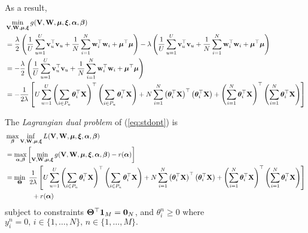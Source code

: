 As a result,
\begin{equation*}
\begin{aligned}
&\min_{\mathbf{V}, \mathbf{W}, \bm{\mu}, \bm{\xi}} g(\mathbf{V}, \mathbf{W}, \bm{\mu}, \bm{\xi}, {\bm{\alpha}}, {\bm{\beta}}) \\
&= \frac{\lambda}{2} \left( \frac{1}{U} \sum_{u=1}^U \mathbf{v}_u^\top \mathbf{v}_u 
     + \frac{1}{N} \sum_{i=1}^N \mathbf{w}_i^\top \mathbf{w}_i + \bm{\mu}^\top \bm{\mu} \right)
     -\lambda \left( \frac{1}{U} \sum_{u=1}^U \mathbf{v}_u^\top \mathbf{v}_u + \frac{1}{N} \sum_{i=1}^N \mathbf{w}_i^\top \mathbf{w}_i + \bm{\mu}^\top \bm{\mu} \right) \\
&= -\frac{\lambda}{2} \left( \frac{1}{U} \sum_{u=1}^U \mathbf{v}_u^\top \mathbf{v}_u + \frac{1}{N} \sum_{i=1}^N \mathbf{w}_i^\top \mathbf{w}_i + \bm{\mu}^\top \bm{\mu} \right) \\
&= -\frac{1}{2 \lambda} \left[
     U \sum_{u=1}^U \left( \sum_{i \in P_u} \bm{\theta}_i^\top \mathbf{X} \right)^\top \left( \sum_{i \in P_u} \bm{\theta}_i^\top \mathbf{X} \right)
   + N \sum_{i=1}^N \left( \bm{\theta}_i^\top \mathbf{X} \right)^\top \left( \bm{\theta}_i^\top \mathbf{X} \right)
   + \left( \sum_{i=1}^N \bm{\theta}_i^\top \mathbf{X} \right)^\top \left( \sum_{i=1}^N \bm{\theta}_i^\top \mathbf{X} \right) \right]
\end{aligned}
\end{equation*}

The \emph{Lagrangian dual problem} of (\ref{eq:stdopt}) is 
\begin{equation*}
\begin{aligned}
&\max_{{\bm{\beta}}} \inf_{\mathbf{V}, \mathbf{W}, \bm{\mu}, \bm{\xi}} L(\mathbf{V}, \mathbf{W}, \bm{\mu}, \bm{\xi}, {\bm{\alpha}}, {\bm{\beta}}) \\
&= \max_{{\bm{\alpha}}, {\bm{\beta}}} \left[ \min_{\mathbf{V}, \mathbf{W}, \bm{\mu}, \bm{\xi}} g(\mathbf{V}, \mathbf{W}, \bm{\mu}, \bm{\xi}, {\bm{\alpha}}, {\bm{\beta}}) - r({\bm{\alpha}}) \right] \\
&= \min_{\mathbf{\Theta}} \ \frac{1}{2 \lambda} \left[
     U \sum_{u=1}^U \left( \sum_{i \in P_u} \bm{\theta}_i^\top \mathbf{X} \right)^\top \left( \sum_{i \in P_u} \bm{\theta}_i^\top \mathbf{X} \right)
   + N \sum_{i=1}^N \left( \bm{\theta}_i^\top \mathbf{X} \right)^\top \left( \bm{\theta}_i^\top \mathbf{X} \right)
   + \left( \sum_{i=1}^N \bm{\theta}_i^\top \mathbf{X} \right)^\top \left( \sum_{i=1}^N \bm{\theta}_i^\top \mathbf{X} \right) \right] \\
& \hspace{4em}
   + r({\bm{\alpha}})
\end{aligned}
\end{equation*}
subject to constraints $\mathbf{\Theta}^\top \mathbf{1}_M = \mathbf{0}_N$, 
and $\theta_i^n \ge 0$ where $y_i^n = 0, \, i \in \{1,\dots,N\}, \, n \in \{1,\dots,M\}.$


